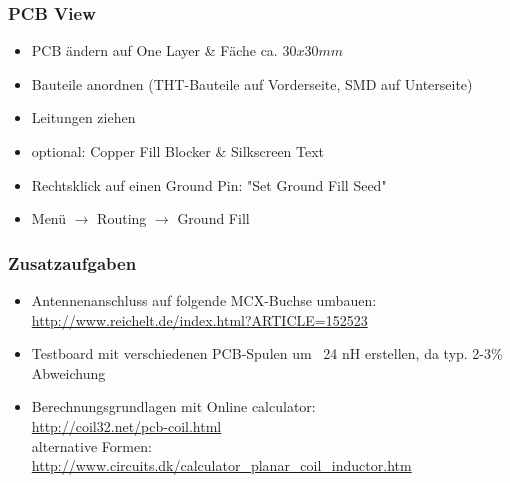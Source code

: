 \subsubsection{PCB View}

\begin{itemize}
    \item PCB ändern auf One Layer \& Fäche ca. $30x30mm$
    \item Bauteile anordnen (THT-Bauteile auf Vorderseite, SMD auf Unterseite)
    \item Leitungen ziehen
    \item optional: Copper Fill Blocker \& Silkscreen Text
    \item Rechtsklick auf einen Ground Pin: "Set Ground Fill Seed"
    \item Menü $\rightarrow$ Routing $\rightarrow$ Ground Fill
\end{itemize}

\subsubsection{Zusatzaufgaben}

\begin{itemize}
    \item Antennenanschluss auf folgende MCX-Buchse umbauen: \\
          \url{http://www.reichelt.de/index.html?ARTICLE=152523}
    \item Testboard mit verschiedenen PCB-Spulen um ~24 nH erstellen, da typ. 2-3\% Abweichung
    \item Berechnungsgrundlagen mit Online calculator:\\
          \url{http://coil32.net/pcb-coil.html}\\
          alternative Formen: \\
          \url{http://www.circuits.dk/calculator_planar_coil_inductor.htm}
\end{itemize}
